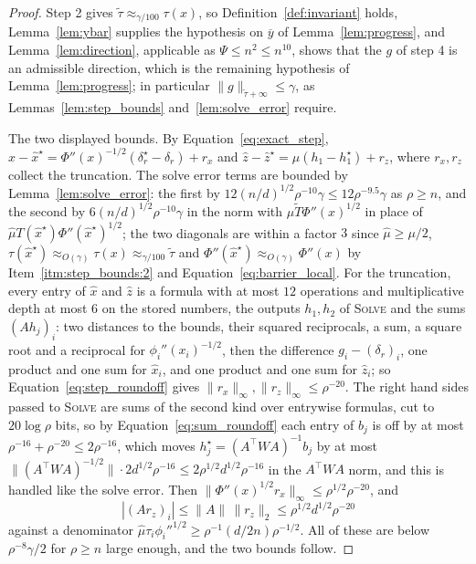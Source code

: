 \documentclass[11pt]{article}
\newcommand{\xhat}{\widehat{x}}
\newcommand{\zhat}{\widehat{z}}
\newcommand{\muhat}{\widehat{\mu}}
\newcommand{\tautil}{\widetilde{\tau}}
\begin{document}
\begin{proof}
Step 2 gives $\tautil \approx_{\gamma / 100} \tau(x)$, so
Definition~\ref{def:invariant} holds, Lemma~\ref{lem:ybar} supplies the
hypothesis on $\overline{y}$ of Lemma~\ref{lem:progress}, and
Lemma~\ref{lem:direction}, applicable as $\Psi \le n^{2} \le n^{10}$, shows that
the $g$ of step 4 is an admissible direction, which is the remaining hypothesis
of Lemma~\ref{lem:progress}; in particular
$\|g\|_{\tautil + \infty} \le \gamma$, as Lemmas~\ref{lem:step_bounds}
and~\ref{lem:solve_error} require.

The two displayed bounds.
By Equation~\eqref{eq:exact_step},
$\xhat - \xhat^{\star} = \Phi''(x)^{-1/2} (\delta_r^{\star} - \delta_r) + r_x$
and $\zhat - \zhat^{\star} = \mu (h_1 - h_1^{\star}) + r_z$, where
$r_x, r_z$ collect the truncation.
The solve error terms are bounded by Lemma~\ref{lem:solve_error}: the first by
$12 (n/d)^{1/2} \rho^{-10} \gamma \le 12 \rho^{-9.5} \gamma$ as
$\rho \ge n$, and the second by
$6 (n/d)^{1/2} \rho^{-10} \gamma$ in the norm with
$\mu \widetilde{T} \Phi''(x)^{1/2}$ in place of
$\muhat T(\xhat^{\star}) \Phi''(\xhat^{\star})^{1/2}$; the two diagonals are
within a factor $3$ since
$\muhat \ge \mu / 2$,
$\tau(\xhat^{\star}) \approx_{O(\gamma)} \tau(x) \approx_{\gamma/100} \tautil$
and $\Phi''(\xhat^{\star}) \approx_{O(\gamma)} \Phi''(x)$ by
Item~\ref{itm:step_bounds:2} and Equation~\eqref{eq:barrier_local}.
For the truncation, every entry of $\xhat$ and
$\zhat$ is a formula with at most
$12$ operations and multiplicative depth at most
$6$ on the stored numbers, the outputs
$h_1, h_2$ of \textsc{Solve} and the sums
$(A h_j)_i$: two distances to the bounds, their squared reciprocals, a sum, a
square root and a reciprocal for $\phi_i''(x_i)^{-1/2}$, then the difference
$g_i - (\delta_r)_i$, one product and one sum for
$\xhat_i$, and one product and one sum for
$\zhat_i$; so Equation~\eqref{eq:step_roundoff} gives
$\|r_x\|_{\infty}, \|r_z\|_{\infty} \le \rho^{-20}$.
The right hand sides passed to \textsc{Solve} are sums of the second kind over
entrywise formulas, cut to $20 \log \rho$ bits, so by
Equation~\eqref{eq:sum_roundoff} each entry of $b_j$ is off by at most
$\rho^{-16} + \rho^{-20} \le 2 \rho^{-16}$, which moves
$h_j^{\star} = (A^\top W A)^{-1} b_j$ by at most
$\|(A^\top W A)^{-1/2}\| \cdot 2 d^{1/2} \rho^{-16} \le 2 \rho^{1/2} d^{1/2} \rho^{-16}$
in the $A^\top W A$ norm, and this is handled like the solve error.
Then $\|\Phi''(x)^{1/2} r_x\|_{\infty} \le \rho^{1/2} \rho^{-20}$, and
\[
\left| (A r_z)_i \right|
\le
\|A\| \, \|r_z\|_2
\le
\rho^{1/2} d^{1/2} \rho^{-20}
\]
against a denominator
$\muhat \tau_i \phi_i''^{1/2} \ge \rho^{-1} (d / 2n) \rho^{-1/2}$.
All of these are below $\rho^{-8} \gamma / 2$ for
$\rho \ge n$ large enough, and the two bounds follow.


\end{proof}
\end{document}
